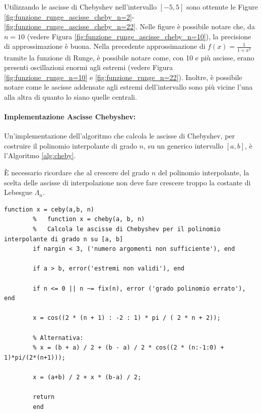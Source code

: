 \begin{example}
	Utilizzando le ascisse di Chebyshev nell'intervallo $[-5,5]$ sono ottenute le Figure \ref{fig:funzione_runge_ascisse_cheby_n=2}-\ref{fig:funzione_runge_ascisse_cheby_n=22}. Nelle figure è possibile notare che, da $n=10$ (vedere Figura \ref{fig:funzione_runge_ascisse_cheby_n=10}), la precisione di approssimazione è buona. Nella precedente approssimazione di $f(x)=\frac{1}{1+x^2}$ tramite la funzione di Runge, è possibile notare come, con 10 e più ascisse, erano presenti oscillazioni enormi agli estremi (vedere Figura \ref{fig:funzione_runge_n=10} e \ref{fig:funzione_runge_n=22}). Inoltre, è possibile notare come le ascisse addensate agli estremi dell'intervallo sono più vicine l'una alla altra di quanto lo siano quelle centrali.
\end{example}

\paragraph{Implementazione Ascisse Chebyshev:} Un'implementazione dell'algoritmo che calcola le ascisse di Chebyshev, per costruire il polinomio interpolante di grado $n$, su un generico intervallo $[a, b]$, è l'Algoritmo \ref{alg:cheby}.

\begin{remark}
    È necessario ricordare che al crescere del grado $n$ del polinomio interpolante, la scelta delle ascisse di interpolazione non deve fare crescere troppo la costante di Lebesgue $\Lambda_n$.
\end{remark}

\begin{algorithm}\caption{Calcolo delle ascisse di Chebyshev su un generico intervallo $[a, b]$.}
	\label{alg:cheby}
	\begin{lstlisting}[style=Matlab-editor]
		function x = ceby(a,b, n)
		%	function x = cheby(a, b, n)
		%	Calcola le ascisse di Chebyshev per il polinomio interpolante di grado n su [a, b]
		if nargin < 3, ('numero argomenti non sufficiente'), end
		
		if a > b, error('estremi non validi'), end
		
		if n <= 0 || n ~= fix(n), error ('grado polinomio errato'), end
		
		x = cos((2 * (n + 1) : -2 : 1) * pi / ( 2 * n + 2));
		
		% Alternativa:
		% x = (b + a) / 2 + (b - a) / 2 * cos((2 * (n:-1:0) + 1)*pi/(2*(n+1)));
		
		x = (a+b) / 2 + x * (b-a) / 2;
		
		return 
		end
	\end{lstlisting}
\end{algorithm}

